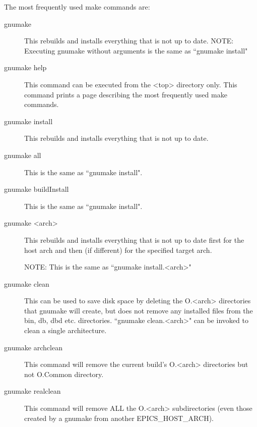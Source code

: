 The most frequently used make commands are:

\begin{description}

\item[gnumake] This rebuilds and installs everything that is not up to date.
NOTE: Executing gnumake without arguments is the same as ``gnumake install"

\item [gnumake help] This command can be executed from the \textless{}top\textgreater{} directory only. This command prints a page describing the most 
frequently used make commands.

\item[gnumake install]

This rebuilds and installs everything that is not up to date.

\item[gnumake all]

This is the same as ``gnumake install".

\item[gnumake buildInstall]

This is the same as ``gnumake install".

\item[gnumake \textless{}arch\textgreater{}]

This rebuilds and installs everything that is not up to date first for the host arch and then (if different) for the 
specified target arch.

NOTE: This is the same as ``gnumake install.\textless{}arch\textgreater{}"

\item[gnumake clean]  

This can be used to save disk space by deleting the O.\textless{}arch\textgreater{} directories that gnumake will create, but does not remove any installed files from the bin, db, dbd etc. directories. ``gnumake clean.\textless{}arch\textgreater{}" can be invoked to clean a single architecture.

\item[gnumake archclean]  

This command will remove the current build's O.\textless{}arch\textgreater{} directories but not O.Common directory.

\item[gnumake realclean]  

This command will remove ALL the O.\textless{}arch\textgreater{} subdirectories (even those created by a gnumake from another 
EPICS\_HOST\_ARCH).


\end{description}
